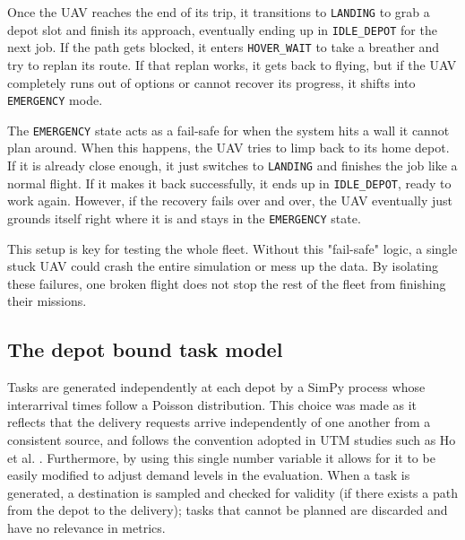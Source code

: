 \vspace{1em}

Once the UAV reaches the end of its trip, it transitions to \texttt{LANDING} to grab a depot slot and finish its approach, eventually ending up in \texttt{IDLE\_DEPOT} for the next job. If the path gets blocked, it enters \texttt{HOVER\_WAIT} to take a breather and try to replan its route. If that replan works, it gets back to flying, but if the UAV completely runs out of options or cannot recover its progress, it shifts into \texttt{EMERGENCY} mode.\par

\vspace{1em}

The \texttt{EMERGENCY} state acts as a fail-safe for when the system hits a wall it cannot plan around. When this happens, the UAV tries to limp back to its home depot. If it is already close enough, it just switches to \texttt{LANDING} and finishes the job like a normal flight. If it makes it back successfully, it ends up in \texttt{IDLE\_DEPOT}, ready to work again. However, if the recovery fails over and over, the UAV eventually just grounds itself right where it is and stays in the \texttt{EMERGENCY} state.\par

\vspace{1em}

This setup is key for testing the whole fleet. Without this "fail-safe" logic, a single stuck UAV could crash the entire simulation or mess up the data. By isolating these failures, one broken flight does not stop the rest of the fleet from finishing their missions.\par

\vspace{1em}

\subsection{The depot bound task model}

Tasks are generated independently at each depot by a SimPy process whose interarrival times follow a Poisson distribution. This choice was made as it reflects that the delivery requests arrive independently of one another from a consistent source, and follows the convention adopted in UTM studies such as Ho et al. \cite{ho2020utm}. Furthermore, by using this single number variable it allows for it to be easily modified to adjust demand levels in the evaluation. When a task is generated, a destination is sampled and checked for validity (if there exists a path from the depot to the delivery); tasks that cannot be planned are discarded and have no relevance in metrics.\par

